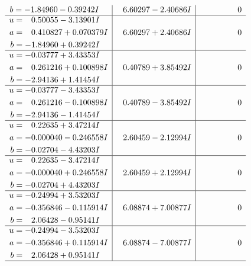 \documentclass[1p]{elsarticle_modified}
\theoremstyle{definition}
\begin{document}
$$\begin{array}{c|c|c}
\begin{aligned}
b &= -1.84960 - 0.39242 I\end{aligned}
 & \phantom{-}6.60297 - 2.40686 I & \phantom{-0.000000 } 0 \\ \hline\begin{aligned}
u &= \phantom{-}0.50055 - 3.13901 I \\
a &= \phantom{-}0.410827 + 0.070379 I \\
b &= -1.84960 + 0.39242 I\end{aligned}
 & \phantom{-}6.60297 + 2.40686 I & \phantom{-0.000000 } 0 \\ \hline\begin{aligned}
u &= -0.03777 + 3.43353 I \\
a &= \phantom{-}0.261216 + 0.100898 I \\
b &= -2.94136 + 1.41454 I\end{aligned}
 & \phantom{-}0.40789 + 3.85492 I & \phantom{-0.000000 } 0 \\ \hline\begin{aligned}
u &= -0.03777 - 3.43353 I \\
a &= \phantom{-}0.261216 - 0.100898 I \\
b &= -2.94136 - 1.41454 I\end{aligned}
 & \phantom{-}0.40789 - 3.85492 I & \phantom{-0.000000 } 0 \\ \hline\begin{aligned}
u &= \phantom{-}0.22635 + 3.47214 I \\
a &= -0.000040 - 0.246558 I \\
b &= -0.02704 - 4.43203 I\end{aligned}
 & \phantom{-}2.60459 - 2.12994 I & \phantom{-0.000000 } 0 \\ \hline\begin{aligned}
u &= \phantom{-}0.22635 - 3.47214 I \\
a &= -0.000040 + 0.246558 I \\
b &= -0.02704 + 4.43203 I\end{aligned}
 & \phantom{-}2.60459 + 2.12994 I & \phantom{-0.000000 } 0 \\ \hline\begin{aligned}
u &= -0.24994 + 3.53203 I \\
a &= -0.356846 - 0.115914 I \\
b &= \phantom{-}2.06428 - 0.95141 I\end{aligned}
 & \phantom{-}6.08874 + 7.00877 I & \phantom{-0.000000 } 0 \\ \hline\begin{aligned}
u &= -0.24994 - 3.53203 I \\
a &= -0.356846 + 0.115914 I \\
b &= \phantom{-}2.06428 + 0.95141 I\end{aligned}
 & \phantom{-}6.08874 - 7.00877 I & \phantom{-0.000000 } 0\\
 \hline 
 \end{array}$$\newpage\newpage\renewcommand{\arraystretch}{1}
\end{document}

